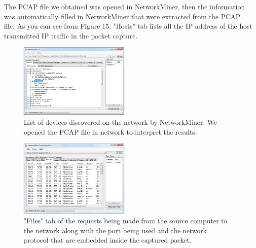 \documentclass{article}
\begin{document}
The PCAP file we obtained was opened in NetworkMiner, then the information was automatically filled in NetworkMiner that were extracted from the PCAP file. As you can see from Figure 15, "Hosts" tab lists all the IP address of the host transmitted IP traffic in the packet capture. 
\begin{figure}[H]
	\begin{center}
		\includegraphics[width=0.48\textwidth]{FINDINGANN1.png}
	\end{center}
	\caption{List of devices discovered on the network by NetworkMiner. We opened the PCAP file in network to interpret the results. }
	\label{fig:Prd}
\end{figure}

\begin{figure}[H]
	\begin{center}
		\includegraphics[width=0.48\textwidth]{FINDINGANN2.png}
	\end{center}
	\caption{"Files" tab of the requests being made from the source computer to the network along with the port being used and the network protocol that are embedded inside the captured packet.}
	\label{fig:Prd}
\end{figure}




\end{document}
